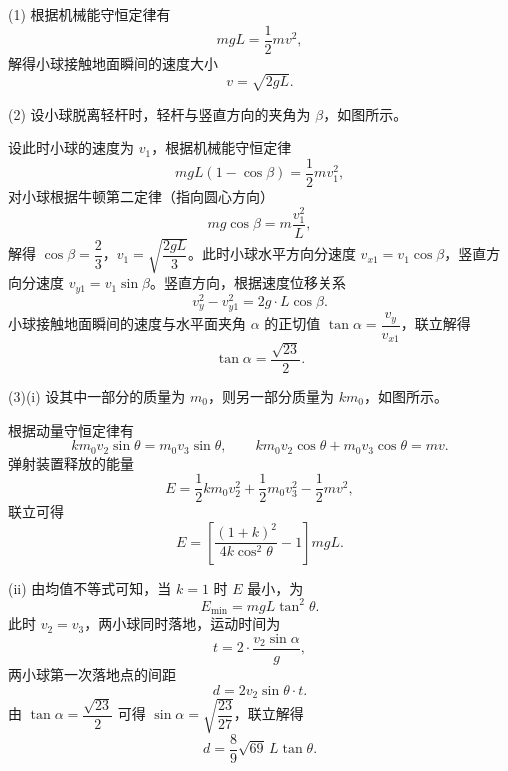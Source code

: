 \begin{answer}
(1) 根据机械能守恒定律有
\[
  mgL=\frac{1}{2}mv^{2},
\]
解得小球接触地面瞬间的速度大小
\[
  v=\sqrt{2gL}.
\]

(2) 设小球脱离轻杆时，轻杆与竖直方向的夹角为 $\beta$，如图所示。


设此时小球的速度为 $v_{1}$，根据机械能守恒定律
\[
  mgL(1-\cos\beta)=\frac{1}{2}mv_{1}^{2},
\]
对小球根据牛顿第二定律（指向圆心方向）
\[
  mg\cos\beta=m\frac{v_{1}^{2}}{L},
\]
解得 $\cos\beta=\dfrac{2}{3}$，$v_{1}=\sqrt{\dfrac{2gL}{3}}$。此时小球水平方向分速度 $v_{x1}=v_{1}\cos\beta$，竖直方向分速度 $v_{y1}=v_{1}\sin\beta$。竖直方向，根据速度位移关系
\[
  v_{y}^{2}-v_{y1}^{2}=2g\cdot L\cos\beta.
\]
小球接触地面瞬间的速度与水平面夹角 $\alpha$ 的正切值 $\tan\alpha=\dfrac{v_{y}}{v_{x1}}$，联立解得
\[
  \tan\alpha=\frac{\sqrt{23}}{2}.
\]

(3)(i) 设其中一部分的质量为 $m_{0}$，则另一部分质量为 $km_{0}$，如图所示。


根据动量守恒定律有
\[
  km_{0}v_{2}\sin\theta=m_{0}v_{3}\sin\theta,\qquad
  km_{0}v_{2}\cos\theta+m_{0}v_{3}\cos\theta=mv.
\]
弹射装置释放的能量
\[
  E=\frac{1}{2}km_{0}v_{2}^{2}+\frac{1}{2}m_{0}v_{3}^{2}-\frac{1}{2}mv^{2},
\]
联立可得
\[
  E=\left[\frac{(1+k)^{2}}{4k\cos^{2}\theta}-1\right]mgL.
\]

(ii) 由均值不等式可知，当 $k=1$ 时 $E$ 最小，为
\[
  E_{\min}=mgL\tan^{2}\theta.
\]
此时 $v_{2}=v_{3}$，两小球同时落地，运动时间为
\[
  t=2\cdot\frac{v_{2}\sin\alpha}{g},
\]
两小球第一次落地点的间距
\[
  d=2v_{2}\sin\theta\cdot t.
\]
由 $\tan\alpha=\dfrac{\sqrt{23}}{2}$ 可得 $\sin\alpha=\sqrt{\dfrac{23}{27}}$，联立解得
\[
  d=\frac{8}{9}\sqrt{69}\,L\tan\theta.
\]
\end{answer}
